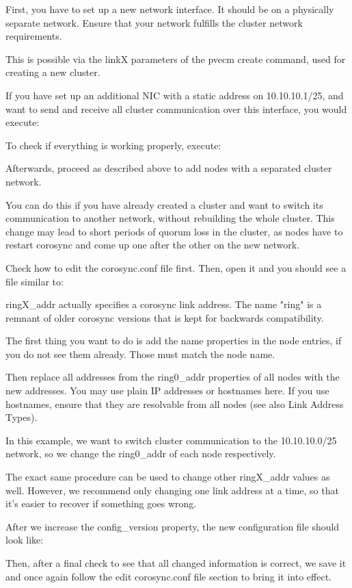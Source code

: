 First, you have to set up a new network interface. It should be on a physically separate network. Ensure that your network fulfills the cluster network requirements.

This is possible via the linkX parameters of the pvecm create command, used for creating a new cluster.

If you have set up an additional NIC with a static address on 10.10.10.1/25, and want to send and receive all cluster communication over this interface, you would execute:

To check if everything is working properly, execute:

Afterwards, proceed as described above to add nodes with a separated cluster network.

You can do this if you have already created a cluster and want to switch its communication to another network, without rebuilding the whole cluster. This change may lead to short periods of quorum loss in the cluster, as nodes have to restart corosync and come up one after the other on the new network.

Check how to edit the corosync.conf file first. Then, open it and you should see a file similar to:

ringX_addr actually specifies a corosync link address. The name "ring" is a remnant of older corosync versions that is kept for backwards compatibility.

The first thing you want to do is add the name properties in the node entries, if you do not see them already. Those must match the node name.

Then replace all addresses from the ring0_addr properties of all nodes with the new addresses. You may use plain IP addresses or hostnames here. If you use hostnames, ensure that they are resolvable from all nodes (see also Link Address Types).

In this example, we want to switch cluster communication to the 10.10.10.0/25 network, so we change the ring0_addr of each node respectively.

The exact same procedure can be used to change other ringX_addr values as well. However, we recommend only changing one link address at a time, so that it’s easier to recover if something goes wrong.

After we increase the config_version property, the new configuration file should look like:

Then, after a final check to see that all changed information is correct, we save it and once again follow the edit corosync.conf file section to bring it into effect.

